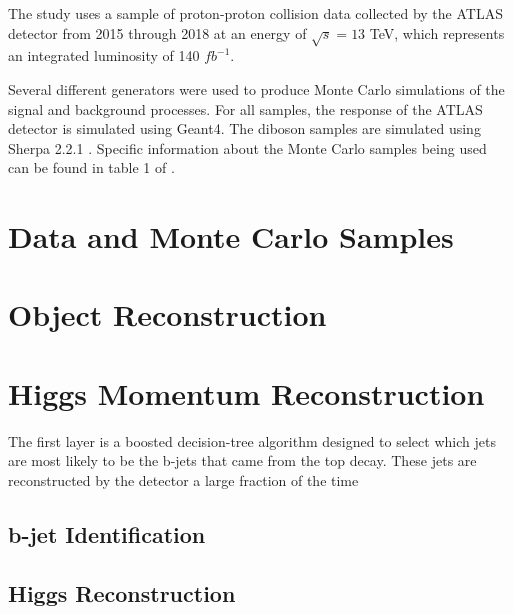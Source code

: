 \documentclass[NOTE, atlasdraft=true, texlive=2016, UKenglish]{\ATLASLATEXPATH atlasdoc}
\begin{document}
The study uses a sample of proton-proton collision data collected by the ATLAS detector from 2015 through 2018 at an energy of $\sqrt{s} = 13$ TeV, which represents an integrated luminosity of 140 $fb^{-1}$. 

Several different generators were used to produce Monte Carlo simulations of the signal and background processes. For all samples, the response of the ATLAS detector is simulated using Geant4. The diboson samples are simulated using Sherpa 2.2.1 \cite{sherpa}. Specific information about the Monte Carlo samples being used can be found in table 1 of \cite{ttH_paper} .



\section{Data and Monte Carlo Samples}
\label{sec:dataMC}

\section{Object Reconstruction}
\label{sec:objReco}


\section{Higgs Momentum Reconstruction}
\label{sec:mva}

The first layer is a boosted decision-tree algorithm designed to select which jets are most likely to be the b-jets that came from the top decay. These jets are reconstructed by the detector a large fraction of the time

\subsection{b-jet Identification}

\subsection{Higgs Reconstruction}
\end{document}
